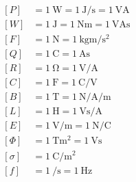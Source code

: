 
\begin{align}
\label{eq:einheit:energie}
\left[P\right] &= \SI{1}{\watt} = \SI{1}{\joule\per\second} = \SI{1}{\volt\ampere}\\
\left[W\right] &= \SI{1}{\joule} = \SI{1}{\newton\meter} =
\SI{1}{\volt\ampere\second}\\
\label{eq:einheit:kraft}
\left[F\right] &= \SI{1}{\newton} = \SI{1}{\kilogram\meter\per\second\squared}\\
\label{eq:einheit:ladung}
\left[Q\right] &= \SI{1}{\coulomb} = \SI{1}{\ampere\second}\\
\label{eq:einheit:widerstand}
\left[R\right] &= \SI{1}{\ohm} = \SI{1}{\volt\per\ampere}\\
\label{eq:einheit:kapazitaet}
\left[C\right] &= \SI{1}{\farad} =
\SI{1}{\coulomb\per\volt}\\
\label{eq:einheit:magnetische:flussdichte}
\left[B\right] &= \SI{1}{\tesla} = \SI{1}{\newton\per\ampere\per\meter}\\
\label{eq:einheit:induktivitaet}
\left[L\right] &= \SI{1}{\henry} = \SI{1}{\volt\second\per\ampere}\\
\label{eq:einheit:elektrisches:feld}
\left[E\right] &= \SI{1}{\volt\per\meter} = \SI{1}{\newton\per\coulomb}\\
\label{eq:einheit:magnetischer:fluss}
\left[\Phi\right] &= \SI{1}{\tesla\meter\squared} = \SI{1}{\volt\second}\\
\label{eq:einheit:elektrische:flussdichte}
\left[\sigma\right] &= \SI{1}{\coulomb\per\meter\squared}\\
\label{eq:einheit:frequenz}
\left[f\right] &= \SI{1}{\per\second} = \SI{1}{\hertz}
\end{align}